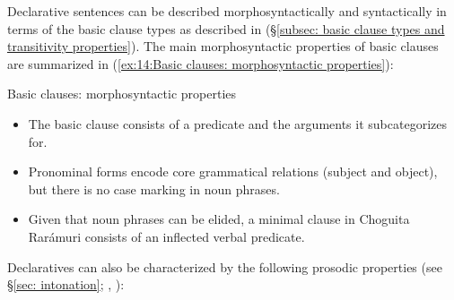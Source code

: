    \label{ex:14:canonical SOV order examplesa}
        \label{ex:14:canonical SOV order examplesb}
    \z
\z

Declarative sentences can be described morphosyntactically and syntactically in terms of the basic clause types as described in  (§\ref{subsec: basic clause types and transitivity properties}). The main morphosyntactic properties of basic clauses are summarized in (\ref{ex:14:Basic clauses: morphosyntactic properties}):

\ea\label{ex:14:Basic clauses: morphosyntactic properties}
{Basic clauses: morphosyntactic properties}

\begin{itemize}
    \item   The basic clause consists of a predicate and the arguments it subcategorizes for.\\
    \item   Pronominal forms encode core grammatical relations (subject and object), but there is no case marking in noun phrases.\\
    \item   Given that noun phrases can be elided, a minimal clause in Choguita Rarámuri consists of an inflected verbal predicate. \\
\end{itemize}
\z

Declaratives can also be characterized by the following prosodic properties (see §\ref{sec: intonation}; \citealt{caballero2014tone}, \citealt{garellek2015lexical}):

